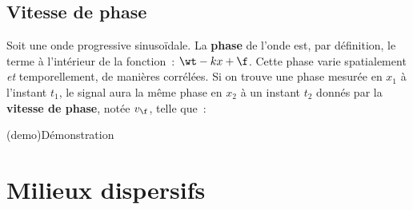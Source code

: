 \documentclass[../../main/main.tex]{subfiles}
\begin{document}
\subsection{Vitesse de phase}

Soit une onde progressive sinusoïdale. La \textbf{phase} de l'onde est, par
définition, le terme à l'intérieur de la fonction~: $\wt-kx+\f$. Cette phase
varie spatialement \textit{et} temporellement, de manières corrélées. Si on
trouve une phase mesurée en $x_1$ à l'instant $t_1$, le signal aura la même
phase en $x_2$ à un instant $t_2$ donnés par la \textbf{vitesse de phase}, notée
$v_\f$, telle que~:
\psw{\[\boxed{v_\f = \frac{x_2-x_1}{t_2-t_1}}\]}
\vspace{-10pt}
\begin{tcb}[sidebyside](demo){Démonstration}
	\tcblower
	\centering
	\vspace{-10pt}
\end{tcb}

\section{Milieux dispersifs}
\end{document}
